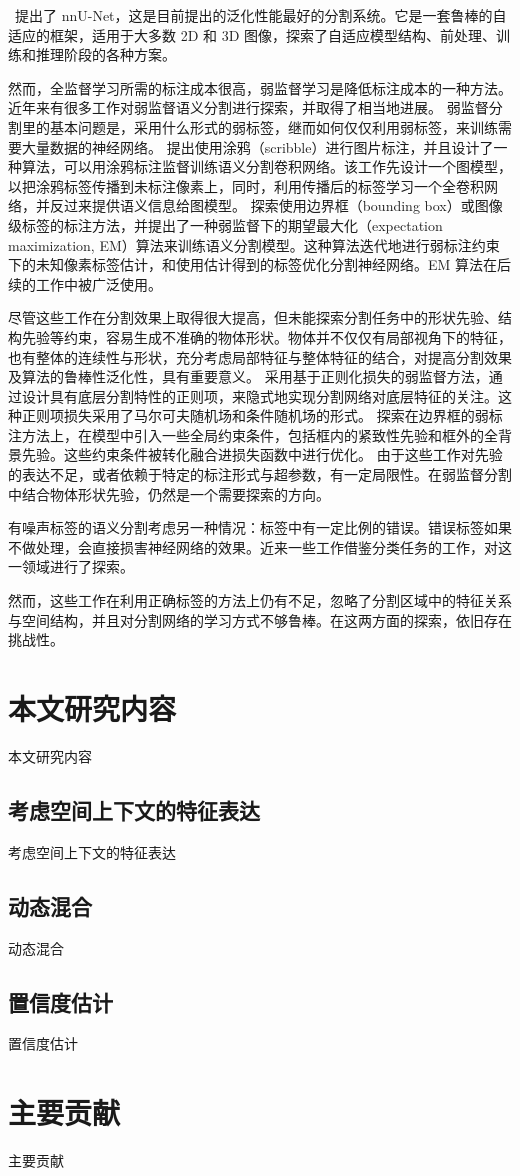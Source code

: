\citet{Isensee}~提出了 nnU-Net，这是目前提出的泛化性能最好的分割系统。它是一套鲁棒的自适应的框架，适用于大多数 2D 和 3D 图像，探索了自适应模型结构、前处理、训练和推理阶段的各种方案。

然而，全监督学习所需的标注成本很高，弱监督学习是降低标注成本的一种方法。近年来有很多工作对弱监督语义分割进行探索，并取得了相当地进展。
弱监督分割里的基本问题是，采用什么形式的弱标签，继而如何仅仅利用弱标签，来训练需要大量数据的神经网络。
\citet{Lin} 提出使用涂鸦（scribble）进行图片标注，并且设计了一种算法，可以用涂鸦标注监督训练语义分割卷积网络。该工作先设计一个图模型，以把涂鸦标签传播到未标注像素上，同时，利用传播后的标签学习一个全卷积网络，并反过来提供语义信息给图模型。
\citet{Alan} 探索使用边界框（bounding box）或图像级标签的标注方法，并提出了一种弱监督下的期望最大化（expectation maximization, EM）算法来训练语义分割模型。这种算法迭代地进行弱标注约束下的未知像素标签估计，和使用估计得到的标签优化分割神经网络。EM 算法在后续的工作中被广泛使用。

尽管这些工作在分割效果上取得很大提高，但未能探索分割任务中的形状先验、结构先验等约束，容易生成不准确的物体形状。物体并不仅仅有局部视角下的特征，也有整体的连续性与形状，充分考虑局部特征与整体特征的结合，对提高分割效果及算法的鲁棒性泛化性，具有重要意义。
\citet{Tang} 采用基于正则化损失的弱监督方法，通过设计具有底层分割特性的正则项，来隐式地实现分割网络对底层特征的关注。这种正则项损失采用了马尔可夫随机场和条件随机场的形式。
\citet{Kervadec} 探索在边界框的弱标注方法上，在模型中引入一些全局约束条件，包括框内的紧致性先验和框外的全背景先验。这些约束条件被转化融合进损失函数中进行优化。
由于这些工作对先验的表达不足，或者依赖于特定的标注形式与超参数，有一定局限性。在弱监督分割中结合物体形状先验，仍然是一个需要探索的方向。

有噪声标签的语义分割考虑另一种情况：标签中有一定比例的错误。错误标签如果不做处理，会直接损害神经网络的效果。近来一些工作借鉴分类任务的工作，对这一领域进行了探索。



然而，这些工作在利用正确标签的方法上仍有不足，忽略了分割区域中的特征关系与空间结构，并且对分割网络的学习方式不够鲁棒。在这两方面的探索，依旧存在挑战性。



\section{本文研究内容}
本文研究内容
\subsection{考虑空间上下文的特征表达}
考虑空间上下文的特征表达
\subsection{动态混合}
动态混合
\subsection{置信度估计}
置信度估计~\cite{stamerjohanns2009mathml}


\section{主要贡献}
主要贡献

